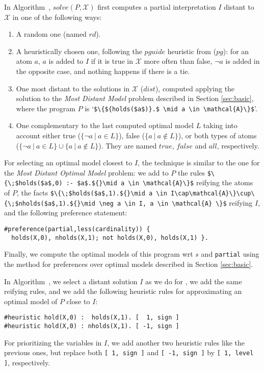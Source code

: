 \documentclass[a4paper,UKenglish]{oasics}
\newcommand{\lm}[1]{\lstinline[mathescape=true]!#1!}
\newcommand{\Alabel}[1]{\textcolor{darkgray}{\small\sffamily\bfseries\mathversion{bold}{A-#1}}}
\begin{document}
In Algorithm~\Alabel{2}, $\mathit{solve}(P,\mathcal{X})$ first computes a partial interpretation $I$ 
distant to $\mathcal{X}$ in one of the following ways:
\begin{enumerate}
\item 
A random one (named $\mathit{rd}$).
\item 
A heuristically chosen one, following the $\mathit{pguide}$ heuristic from \cite{nadel11a} ($pg$):
for an atom $a$, $a$ is added to $I$ if it is true in $\mathcal{X}$ more often than false, 
$\neg a$ is added in the opposite case, and nothing happens if there is a tie.
%
%
\item 
One most distant to the solutions in $\mathcal{X}$ ($\mathit{dist}$), 
computed applying the solution to the \emph{Most Distant Model} problem described in Section \ref{sec:basic}, %
where the program $P$ is `\lstinline[mathescape=true]!$\{${holds($a$)}.$ \mid a \in \mathcal{A}\}$!'.
\item 
One complementary to the last computed optimal model $L$ 
taking into account either 
true ($\{ \neg a \ | \ a \in L\}$), 
false ($\{ a \ | \ a \notin L\}$), 
or both types of atoms ($\{ \neg a \ | \ a \in L\} \cup \{ a \ | \ a \notin L\}$). 
They are named $\mathit{true}$, $\mathit{false}$ and $\mathit{all}$, respectively.
\end{enumerate}
%
For selecting an optimal model closest to $I$, 
the technique is similar to the one for the \emph{Most Distant Optimal Model} problem:
we add to $P$ the rules 
\lm{$\{\;$holds($a$,0) :- $a$.${}\mid a \in \mathcal{A}\}$} reifying the atoms of $P$, 
the facts 
\lm{$\{\;$holds($a$,1).${}\mid a \in I\cap\mathcal{A}\}\cup\{\;$nholds($a$,1).${}\mid \neg a \in I, a \in \mathcal{A} \}$} reifying $I$,  
and the following preference statement: 
\begin{lstlisting}
#preference(partial,less(cardinality)) {
  holds(X,0), nholds(X,1); not holds(X,0), holds(X,1) }.
\end{lstlisting}
Finally, we compute the optimal models of this program wrt $s$ and \lm{partial}
using the method for preferences over optimal models described in Section \ref{sec:basic}. %

In Algorithm~\Alabel{3},
we select a distant solution $I$ as we do for \Alabel{2}, 
we add the same reifying rules, 
and we add the following heuristic rules for approximating an optimal model of $P$ close to $I$:
\begin{lstlisting}
#heuristic hold(X,0) :  holds(X,1). [  1, sign ]
#heuristic hold(X,0) : nholds(X,1). [ -1, sign ]
\end{lstlisting}
For prioritizing the variables in $I$, we add another two heuristic rules like the previous ones, 
but replace both \lm{[ 1, sign ]} and \lm{[ -1, sign ]} by \lm{[ 1, level ]}, respectively.
%
%
%
%
%
%
%
\end{document}
